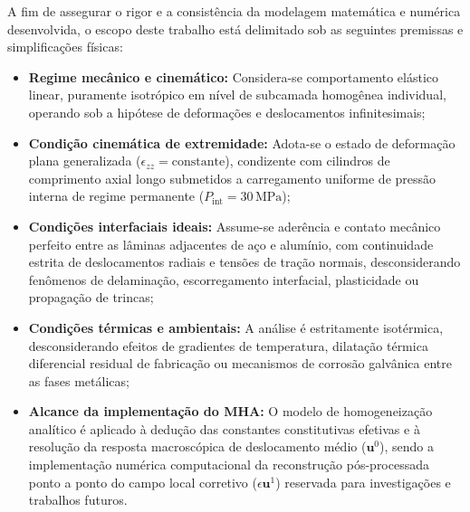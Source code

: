 A fim de assegurar o rigor e a consistência da modelagem matemática e numérica desenvolvida, o escopo deste trabalho está delimitado sob as seguintes premissas e simplificações físicas:
\begin{itemize}
    \item \textbf{Regime mecânico e cinemático:} Considera-se comportamento elástico linear, puramente isotrópico em nível de subcamada homogênea individual, operando sob a hipótese de deformações e deslocamentos infinitesimais;
    \item \textbf{Condição cinemática de extremidade:} Adota-se o estado de deformação plana generalizada ($\epsilon_{zz} = \text{constante}$), condizente com cilindros de comprimento axial longo submetidos a carregamento uniforme de pressão interna de regime permanente ($P_{\text{int}} = 30 \, \text{MPa}$);
    \item \textbf{Condições interfaciais ideais:} Assume-se aderência e contato mecânico perfeito entre as lâminas adjacentes de aço e alumínio, com continuidade estrita de deslocamentos radiais e tensões de tração normais, desconsiderando fenômenos de delaminação, escorregamento interfacial, plasticidade ou propagação de trincas;
    \item \textbf{Condições térmicas e ambientais:} A análise é estritamente isotérmica, desconsiderando efeitos de gradientes de temperatura, dilatação térmica diferencial residual de fabricação ou mecanismos de corrosão galvânica entre as fases metálicas;
    \item \textbf{Alcance da implementação do MHA:} O modelo de homogeneização analítico é aplicado à dedução das constantes constitutivas efetivas e à resolução da resposta macroscópica de deslocamento médio ($\mathbf{u}^0$), sendo a implementação numérica computacional da reconstrução pós-processada ponto a ponto do campo local corretivo ($\epsilon \mathbf{u}^1$) reservada para investigações e trabalhos futuros.
\end{itemize}
